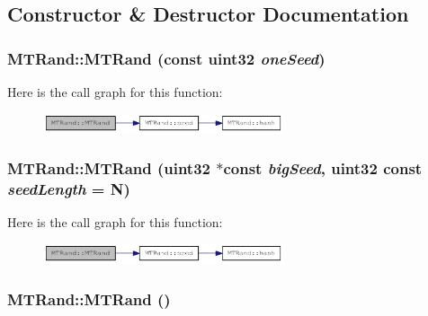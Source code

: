 \subsection{Constructor \& Destructor Documentation}
\hypertarget{classMTRand_a172bc7e7cf1e578ef3f9c90a8cee3eb1}{
\subsubsection[{MTRand}]{\setlength{\rightskip}{0pt plus 5cm}MTRand::MTRand (const {\bf uint32} {\em oneSeed})}}
\label{classMTRand_a172bc7e7cf1e578ef3f9c90a8cee3eb1}


Here is the call graph for this function:\nopagebreak
\begin{figure}[H]
\begin{center}
\leavevmode
\includegraphics[width=200pt]{classMTRand_a172bc7e7cf1e578ef3f9c90a8cee3eb1_cgraph}
\end{center}
\end{figure}
\hypertarget{classMTRand_a380e79e0192b46426abcefa6e2dd082e}{
\subsubsection[{MTRand}]{\setlength{\rightskip}{0pt plus 5cm}MTRand::MTRand ({\bf uint32} $\ast$const  {\em bigSeed}, \/  {\bf uint32} const {\em seedLength} = {\ttfamily N})}}
\label{classMTRand_a380e79e0192b46426abcefa6e2dd082e}


Here is the call graph for this function:\nopagebreak
\begin{figure}[H]
\begin{center}
\leavevmode
\includegraphics[width=200pt]{classMTRand_a380e79e0192b46426abcefa6e2dd082e_cgraph}
\end{center}
\end{figure}
\hypertarget{classMTRand_a265dc65546e26073c0d5f8787b045a1d}{
\subsubsection[{MTRand}]{\setlength{\rightskip}{0pt plus 5cm}MTRand::MTRand ()}}
\label{classMTRand_a265dc65546e26073c0d5f8787b045a1d}


